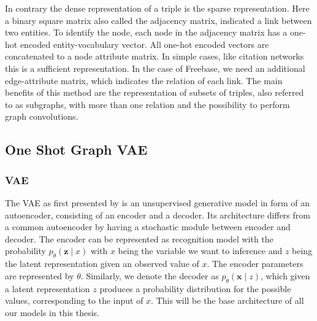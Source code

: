 In contrary the dense representation of a triple is the sparse representation. Here a binary square matrix also called the adjacency matrix, indicated a link between two entities. To identify the node, each node in the adjacency matrix has a one-hot encoded entity-vocabulary vector. All one-hot encoded vectors are concatenated to a node attribute matrix.
In simple cases, like citation networks this is a sufficient representation. In the case of Freebase, we need an additional edge-attribute matrix, which indicates the relation  of each link. The main benefits of this method are the representation of subsets of triples, also referred to as subgraphs, with more than one relation and the possibility to perform graph convolutions. 



\subsection{One Shot Graph VAE}

\subsubsection{VAE}
\label{ssection:VAE}



The VAE as first presented by \cite{kingma_auto-encoding_2014} is an unsupervised generative model in form of an autoencoder, consisting of an encoder and a decoder. Its architecture differs from a common autoencoder by having a stochastic module between encoder and decoder. The encoder can be represented as recognition model with the probability $p_{{\theta}}(\mathbf{z} \mid x)$ with $x$ being the variable we want to inference and $z$ being the latent representation given an observed value of $x$. The encoder parameters are represented by $\theta$. Similarly, we denote the decoder as $p_{{\theta}}(\mathbf{x} \mid z)$, which given a latent representation $z$ produces a probability distribution for the possible values, corresponding to the input of $x$. This will be the base architecture of all our models in this thesis.

